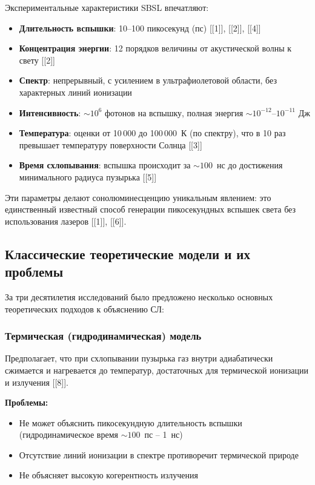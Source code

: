 \documentclass[12pt,a4paper]{article}
\begin{document}
Экспериментальные характеристики SBSL впечатляют:
\begin{itemize}
    \item \textbf{Длительность вспышки}: 10--100 пикосекунд (пс) [[1]], [[2]], [[4]]
    \item \textbf{Концентрация энергии}: 12 порядков величины от акустической волны к свету [[2]]
    \item \textbf{Спектр}: непрерывный, с усилением в ультрафиолетовой области, без характерных линий ионизации
    \item \textbf{Интенсивность}: $\sim 10^6$ фотонов на вспышку, полная энергия $\sim 10^{-12}$--$10^{-11}$ Дж
    \item \textbf{Температура}: оценки от 10\,000 до 100\,000~К (по спектру), что в 10 раз превышает температуру поверхности Солнца [[3]]
    \item \textbf{Время схлопывания}: вспышка происходит за $\sim 100$~нс до достижения минимального радиуса пузырька [[5]]
\end{itemize}

Эти параметры делают сонолюминесценцию уникальным явлением: это единственный известный способ генерации пикосекундных вспышек света без использования лазеров [[1]], [[6]].

\subsection{Классические теоретические модели и их проблемы}

За три десятилетия исследований было предложено несколько основных теоретических подходов к объяснению СЛ:

\subsubsection{Термическая (гидродинамическая) модель}
Предполагает, что при схлопывании пузырька газ внутри адиабатически сжимается и нагревается до температур, достаточных для термической ионизации и излучения [[8]]. 

\textbf{Проблемы:}
\begin{itemize}
    \item Не может объяснить пикосекундную длительность вспышки (гидродинамическое время $\sim 100$~пс -- 1~нс)
    \item Отсутствие линий ионизации в спектре противоречит термической природе
    \item Не объясняет высокую когерентность излучения
\end{itemize}
\end{document}
